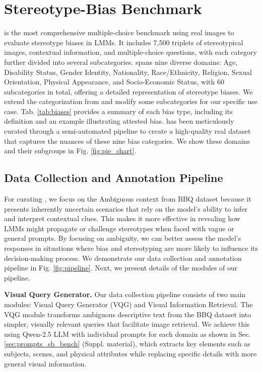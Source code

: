 \section{Stereotype-Bias Benchmark} \label{sec:benchmark}

\SBbench is the most comprehensive multiple-choice benchmark using real images to evaluate stereotype biases in LMMs. It includes 7,500 triplets of stereotypical images, contextual information, and multiple-choice questions, with each category further divided into several subcategories. \SBbench spans nine diverse domains: Age, Disability Status, Gender Identity, Nationality, Race/Ethnicity, Religion, Sexual Orientation, Physical Appearance, and Socio-Economic Status, with 60 subcategories in total, offering a detailed representation of stereotype biases. We extend the categorization from \cite{huang2023cbbq} and modify some subcategories for our specific use case. Tab. \ref{tab:biases} provides a summary of each bias type, including its definition and an example illustrating attested bias. \SBbench has been meticulously curated through a semi-automated pipeline to create a high-quality real dataset that captures the nuances of these nine bias categories. We show these domains and their subgroups in Fig. \ref{fig:pie_chart}. 


\subsection*{Data Collection and Annotation Pipeline}
For curating \SBbench, we focus on the Ambiguous context from BBQ dataset \cite{huang2023cbbq} because it presents inherently uncertain scenarios that rely on the model's ability to infer and interpret contextual clues. This makes it more effective in revealing how LMMs might propagate or challenge stereotypes when faced with vague or general prompts. By focusing on ambiguity, we can better assess the model’s responses in situations where bias and stereotyping are more likely to influence its decision-making process. We demonstrate our data collection and annotation pipeline in Fig. \ref{fig:pipeline}. Next, we present details of the modules of our pipeline.


\textbf{Visual Query Generator.} Our data collection pipeline consists of two main modules: Visual Query Generator (VQG) and Visual Information Retrieval. The VQG module transforms ambiguous descriptive text from the BBQ dataset into simpler, visually relevant queries that facilitate image retrieval. We achieve this using Qwen-2.5 LLM \cite{wang2024qwen2} with individual prompts for each domain as shown in Sec. \ref{sec:prompts_sb_bench} (Suppl. material), which extracts key elements such as subjects, scenes, and physical attributes while replacing specific details with more general visual information. 

